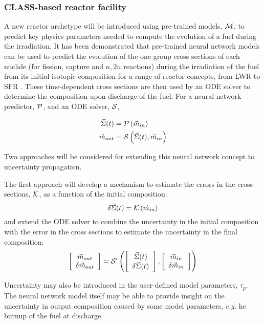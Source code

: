 \documentclass[dvips,12pt]{article}
\newcommand{\uncvector}[1]
{ \left[ \begin{array}{c} #1 \\ \delta #1 \end{array} \right] }
\begin{document}
\subsubsection{CLASS-based reactor facility}

A new reactor archetype will be introduced using
pre-trained models, ${\cal M}$, to predict key
physics parameters needed to compute the evolution
of a fuel during the irradiation. It has been
demonstrated that pre-trained neural network
models can be used to predict the evolution of the
one group cross sections of each nuclide (for
fission, capture and $n,2n$ reactions) during the
irradiation of the fuel from its initial isotopic
composition for a range of reactor concepts, from
LWR to SFR \cite{Leniau.ANE.2015,
  Leniau.PHYSOR.2016}.  These time-dependent cross
sections are then used by an ODE solver to
determine the composition upon discharge of the
fuel.  For a neural network predictor, ${\cal P}$,
and an ODE solver, ${\cal S}$,

\begin{align}
  \vec{\Sigma}(t) &= {\cal P}\left( \vec{m}_{in}\right)\\
  \vec{m}_{out} &= {\cal S}\left( \vec{\Sigma}(t), \vec{m}_{in}\right)
\end{align}

Two approaches will be considered for extending
this neural network concept to uncertainty
propagation.

The first approach will develop a mechanism to
estimate the errors in the cross-sections, 
${\cal K}$, as a function of the initial composition:
\begin{equation}
  \delta\vec{\Sigma}(t) = {\cal K}\left( \vec{m}_{in}\right)
\end{equation}
and extend the ODE solver to combine the
uncertainty in the initial composition with the
error in the cross sections to estimate the
uncertainty in the final composition:
\begin{equation}
  \uncvector{\vec{m}_{out}} = {\cal S^\prime}\left( \uncvector{\vec{\Sigma}(t)}, \uncvector{\vec{m}_{in}}\right)
\end{equation}

Uncertainty may also be introduced in the
user-defined model parameters, $\tau_p$.  The
neural network model itself may be able to provide
insight on the uncertainty in output composition
caused by some model parameters, \textit{e.g.} he
burnup of the fuel at discharge.
\end{document}
